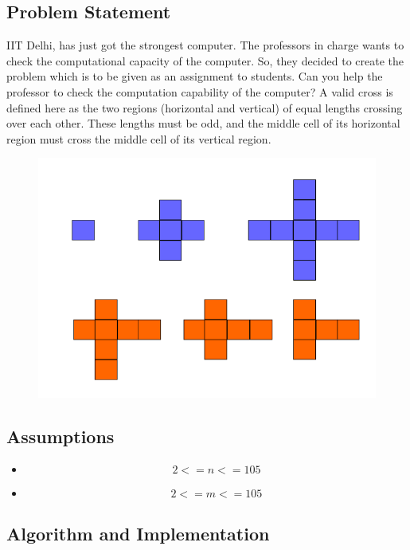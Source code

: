 \documentclass[12pt]{article}
\begin{document}
	
		\subsection{Problem Statement}\cite{problem1}
			IIT Delhi, has just got the strongest computer. The professors in charge wants to check the computational capacity of the computer. So, they decided to create the problem which is to be given as an assignment to students. Can you help the professor to check the computation capability of the computer?
		A valid cross is defined here as the two regions (horizontal and vertical) of equal lengths crossing over each other. These lengths must be odd, and the middle cell of its horizontal region must cross the middle cell of its vertical region.

			\begin{figure}
			\includegraphics[scale=0.6]{ps1p1.png}
			\end{figure}
		\subsection{Assumptions}
		
			\begin{itemize}
				\item $$2 <= n <= 105$$
				\item $$2 <= m <= 105$$
			\end{itemize}
		
		\subsection{Algorithm and Implementation~\cite{}}
		
\end{document}
